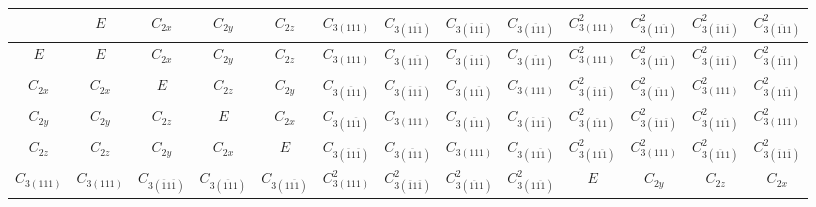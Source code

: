 \documentclass[12pt]{report}
\begin{document}
 
 
\newcommand{\rr}{\boldsymbol{r}} 
\newcommand{\kk}{\boldsymbol{k}} 
\newcommand{\RR}{\boldsymbol{R}} 
\newcommand{\fsp}{\mbox{ }} 
\renewcommand{\le}{\leqslant} 
\renewcommand{\ge}{\geqslant} 
\newcommand{\ds}{\displaystyle} 
\newcommand{\eps}{\varepsilon} 
\newcommand{\fmbr}{\begin{array}{c}} 
\newcommand{\fm}{\end{array}} 
\newcommand{\ra}{{\rightarrow}} 
\newcommand{\eq}{\begin{equation}} 
\newcommand{\eeq}{\end{equation}} 
\newcommand{\arsh}{\mathop{\rm arsh}\nolimits} 
 

\begin{tabular}{c | c c c c c c c c c c c c } 
& $E$& $C_{2x}$& $C_{2y}$& $C_{2z}$& $C_{3(111)}$& $C_{3(1\overline{11})}$& $C_{3(\overline{1}1\overline{1})}$& $C_{3(\overline{11}1)}$& $C_{3(111)}^2$& $C_{3(1\overline{11})}^2$& $C_{3(\overline{1}1\overline{1})}^2$& $C_{3(\overline{11}1)}^2$\\ 
 \hline 
 $E$& $E$& $C_{2x}$& $C_{2y}$& $C_{2z}$& $C_{3(111)}$& $C_{3(1\overline{11})}$& $C_{3(\overline{1}1\overline{1})}$& $C_{3(\overline{11}1)}$& $C_{3(111)}^2$& $C_{3(1\overline{11})}^2$& $C_{3(\overline{1}1\overline{1})}^2$& $C_{3(\overline{11}1)}^2$\\
$C_{2x}$& $C_{2x}$& $E$& $C_{2z}$& $C_{2y}$& $C_{3(\overline{11}1)}$& $C_{3(\overline{1}1\overline{1})}$& $C_{3(1\overline{11})}$& $C_{3(111)}$& $C_{3(\overline{1}1\overline{1})}^2$& $C_{3(\overline{11}1)}^2$& $C_{3(111)}^2$& $C_{3(1\overline{11})}^2$\\
$C_{2y}$& $C_{2y}$& $C_{2z}$& $E$& $C_{2x}$& $C_{3(1\overline{11})}$& $C_{3(111)}$& $C_{3(\overline{11}1)}$& $C_{3(\overline{1}1\overline{1})}$& $C_{3(\overline{11}1)}^2$& $C_{3(\overline{1}1\overline{1})}^2$& $C_{3(1\overline{11})}^2$& $C_{3(111)}^2$\\
$C_{2z}$& $C_{2z}$& $C_{2y}$& $C_{2x}$& $E$& $C_{3(\overline{1}1\overline{1})}$& $C_{3(\overline{11}1)}$& $C_{3(111)}$& $C_{3(1\overline{11})}$& $C_{3(1\overline{11})}^2$& $C_{3(111)}^2$& $C_{3(\overline{11}1)}^2$& $C_{3(\overline{1}1\overline{1})}^2$\\
$C_{3(111)}$& $C_{3(111)}$& $C_{3(\overline{1}1\overline{1})}$& $C_{3(\overline{11}1)}$& $C_{3(1\overline{11})}$& $C_{3(111)}^2$& $C_{3(\overline{1}1\overline{1})}^2$& $C_{3(\overline{11}1)}^2$& $C_{3(1\overline{11})}^2$& $E$& $C_{2y}$& $C_{2z}$& $C_{2x}$\\

\end{tabular}
\end{document}
